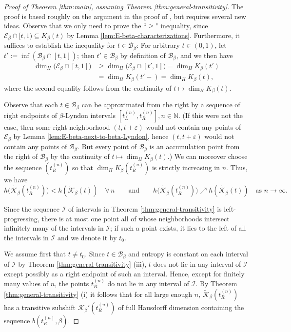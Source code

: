 \documentclass[11pt]{amsart}
\theoremstyle{definition}
\theoremstyle{remark}
\numberwithin{equation}{section}
\newcommand{\N}{\ensuremath{\mathbb{N}}}
\newcommand{\BB}{\mathscr{B}}
\newcommand{\EE}{\mathscr{E}}
\newcommand{\II}{\mathcal{I}}
\newcommand{\Kt}{\widetilde{\mathcal{K}}}
\newcommand{\ep}{\varepsilon}
\newcommand{\f}{\infty}
\begin{document}
\begin{proof}[Proof of Theorem \ref{thm:main}, assuming Theorem \ref{thm:general-transitivity}]
The proof is based roughly on the argument in the proof of \cite[Lemma 3.8]{Baker-Kong-2020}, but requires several new ideas. Observe that we only need to prove the ``$\geq$" inequality, since $\EE_\beta\cap[t,1)\subseteq K_\beta(t)$ by Lemma \ref{lem:E-beta-characterizations}. Furthermore, it suffices to establish the inequality for $t\in \BB_\beta$: For arbitrary $t\in(0,1)$, let $t':=\inf(\BB_\beta\cap[t,1])$; {then $t'\in\BB_\beta$ by definition of $\BB_\beta$, and}
 we then have
\begin{align*}
\dim_H\big(\EE_\beta\cap[t,1])&\geq \dim_H\big(\EE_\beta\cap[t',1])=\dim_H K_\beta(t')\\
&=\dim_H {K_\beta(t'-)}=\dim_H K_\beta(t),
\end{align*}
where the {second} equality follows from the continuity of $t\mapsto \dim_H K_\beta(t)$.

Observe that each $t\in\BB_\beta$ can be approximated from the right by a sequence of right endpoints of $\beta$-Lyndon intervals $[t_L^{(n)},t_R^{(n)}], n\in\N$. (If this were not the case, then some right neighborhood $(t,t+\ep)$ would not contain any points of $\EE_\beta$ by Lemma \ref{lem:E-beta-next-to-beta-Lyndon}, hence $(t,t+\ep)$ would not contain any points of $\BB_\beta$. But every point of $\BB_\beta$ is an accumulation point from the right of $\BB_\beta$ by the continuity of $t\mapsto \dim_H K_\beta(t)$.) We can moreover choose the sequence $(t_R^{(n)})$ so that $\dim_H K_\beta(t_R^{(n)})$ is strictly increasing in $n$. Thus, we have
\[
h\big(\Kt_\beta(t_R^{(n)})\big)<h(\Kt_\beta(t)) \quad\forall\,n \qquad\mbox{and} \qquad h\big(\Kt_\beta(t_R^{(n)})\big)\nearrow h(\Kt_\beta(t)) \quad\mbox{as $n\to\f$}.
\]

Since the sequence $\II$ of intervals in Theorem \ref{thm:general-transitivity} is left-progressing, there is at most one point all of whose neighborhoods intersect infinitely many of the intervals in $\II$; if such a point exists, it lies to the left of all the intervals in $\II$ and we denote it by $t_0$.

We assume first that $t\neq t_0$. {Since $t\in\BB_\beta$ and entropy is constant on each interval of $\II$ by Theorem \ref{thm:general-transitivity} (iii), $t$ does not lie in any interval of $\II$ except possibly as a right endpoint of such an interval. Hence, except for finitely many values of $n$, the points $t_R^{(n)}$ do not lie in any interval of $\II$.}  
By Theorem \ref{thm:general-transitivity} (i) it follows that for all large enough $n$, $\Kt_\beta(t_R^{(n)})$ has a transitive subshift $\mathcal{K}_\beta'(t_R^{(n)})$ of full Hausdorff dimension containing the sequence $b(t_R^{(n)},\beta)$.


\end{proof}
\end{document}
